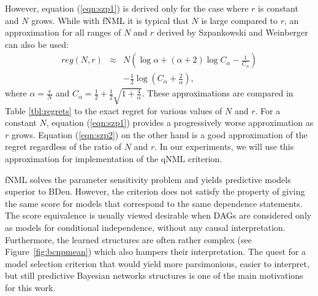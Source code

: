 However, equation (\ref{eqn:szp1}) is derived only for the case
where $r$ is constant and $N$ grows. While with
fNML it is typical that $N$ is large compared to $r$, an
approximation for all ranges of $N$ and $r$ derived by
Szpankowski and Weinberger~\cite{Szpankowski2012} can also be used:
\begin{eqnarray}
\label{eqn:szp2}
    reg(N, r) & \approx & N\left(\log{\alpha} + (\alpha + 2) \log{C_\alpha}
                - \frac{1}{C_\alpha}\right)\nonumber \\
    && - \frac{1}{2} \log{\left(C_\alpha + \frac{2}{\alpha}\right)},
\end{eqnarray}
where $\alpha = \frac{r}{N}$ and
    $C_\alpha = \frac{1}{2} + \frac{1}{2} \sqrt{1 + \frac{4}{\alpha}}$.
These approximations are compared in Table \ref{tbl:regrets} to the
exact regret for various values of $N$ and $r$.  For a constant $N$,
equation (\ref{eqn:szp1}) provides a progressively worse approximation
as $r$ grows. Equation (\ref{eqn:szp2}) on the other hand is a good
approximation of the regret regardless of the ratio of $N$ and $r$.
In our experiments, we will use this approximation for 
implementation of the qNML criterion.


fNML solves the parameter sensitivity problem and yields predictive
models superior to BDeu.  However, the criterion does not satisfy the
property of giving the same score for models that correspond to the
same dependence statements. The score equivalence is usually viewed desirable when DAGs are considered only as models for conditional independence, without any causal interpretation. Furthermore, the learned structures are
often rather complex (see Figure~\ref{fig:bcnpmean}) which also
hampers their interpretation. The quest for a model selection
criterion that would yield more parsimonious, easier to interpret, but
still predictive Bayesian networks structures is one of the main
motivations for this work.


